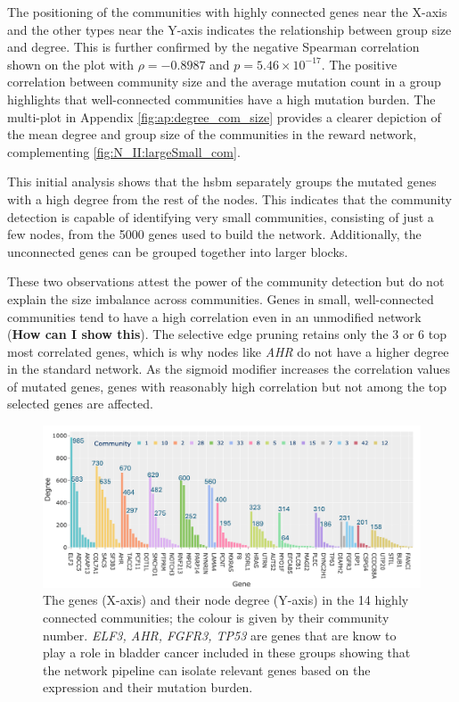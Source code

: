 The positioning of the communities with highly connected genes near the X-axis and the other types near the Y-axis indicates the relationship between group size and degree. This is further confirmed by the negative Spearman correlation shown on the plot with $\rho = -0.8987$ and $p = 5.46 \times 10^{-17}$. The positive correlation between community size and the average mutation count in a group highlights that well-connected communities have a high mutation burden. The multi-plot in Appendix \cref{fig:ap:degree_com_size} provides a clearer depiction of the mean degree and group size of the communities in the reward network, complementing \cref{fig:N_II:largeSmall_com}.


This initial analysis shows that the \acrfull{hsbm} separately groups the mutated genes with a high degree from the rest of the nodes. This indicates that the community detection is capable of identifying very small communities, consisting of just a few nodes, from the 5000 genes used to build the network. Additionally, the unconnected genes can be grouped together into larger blocks.


These two observations attest the power of the community detection but do not explain the size imbalance across communities. Genes in small, well-connected communities tend to have a high correlation even in an unmodified network (\textbf{How can I show this}). The selective edge pruning retains only the 3 or 6 top most correlated genes, which is why nodes like \textit{AHR} do not have a higher degree in the standard network. As the sigmoid modifier increases the correlation values of mutated genes, genes with reasonably high correlation but not among the top selected genes are affected.


\begin{figure}[!htb]    
    \centering
    \includegraphics[width=1.0\textwidth,height=1.0\textheight,keepaspectratio]{Sections/Network_II/resources/reward/SmallCom_gene_labeled.png}
    \caption{The genes (X-axis) and their node degree (Y-axis) in the 14 highly connected communities; the colour is given by their community number. \textit{ELF3, AHR, FGFR3, TP53} are genes that are know to play a role in bladder cancer \citet{Robertson2017-mg} included in these groups showing that the network pipeline can isolate relevant genes based on the expression and their mutation burden.}
    \label{fig:N_II:genes_highConn}
\end{figure}


